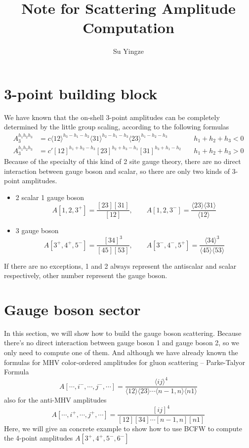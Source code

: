 \documentclass[12pt]{article}
\newcommand{\mdavg}[2]{\langle #1 \rangle\!\langle #2 \rangle}
\newcommand{\avg}[1]{\langle #1 \rangle}
\begin{document}
\title{Note for Scattering Amplitude Computation}
\author{Su Yingze}
\maketitle

\section{3-point building block}
We have known that the on-shell 3-point amplitudes can be completely determined by the little group scaling, according to the following formulas
\begin{align*}
    A_3^{h_1h_2h_3} &= c\avg{12}^{h_3-h_1-h_2}\avg{31}^{h_2-h_1-h_3}\avg{23}^{h_1-h_2-h_3}
    \quad & h_1+h_2+h_3 < 0 \\[0.5em]
    A_3^{h_1h_2h_3} &= c' [12]^{h_1+h_2-h_3}[23]^{h_2+h_3-h_1}[31]^{h_3+h_1-h_2}
    \quad & h_1+h_2+h_3 > 0
\end{align*}
Because of the specialty of this kind of 2 site gauge theory, there are no direct interaction between gauge boson and scalar, so there are only two kinds of 3-point amplitudes.
\begin{itemize}
    \item 2 scalar 1 gauge boson
    \begin{equation*}
        A[1,2,3^+]=\frac{[23][31]}{[12]},\qquad A[1,2,3^-]=\frac{\mdavg{23}{31}}{\avg{12}}
    \end{equation*}
    \item 3 gauge boson
    \begin{equation*}
        A[3^+,4^+,5^-]=\frac{[34]^3}{[45][53]},\qquad A[3^-,4^-,5^+]=\frac{\avg{34}^3}{\mdavg{45}{53}}
    \end{equation*}
\end{itemize}
If there are no exceptions, 1 and 2 always represent the antiscalar and scalar respectively, other number represent the gauge boson.  


\section{Gauge boson sector}
In this section, we will show how to build the gauge boson scattering. Because there's no direct interaction between gauge boson 1 and gauge boson 2, so we only need to compute one of them.
And although we have already known the formulas for MHV color-ordered amplitudes for gluon scattering -- Parke-Talyor Formula 
\begin{equation*}
    A[\cdots,i^-,\cdots,j^-,\cdots]=\frac{\avg{ij}^4}{\mdavg{12}{23}\cdots\mdavg{n-1,n}{n1}}
\end{equation*}
also for the anti-MHV amplitudes
\begin{equation*}
    A[\cdots,i^+,\cdots,j^+,\cdots]=\frac{[ij]^4}{[12][34]\cdots[n-1,n][n1]}
\end{equation*}
Here, we will give an concrete example to show how to use BCFW to compute the 4-point amplitudes $A[3^+,4^+,5^-,6^-]$
\end{document}
